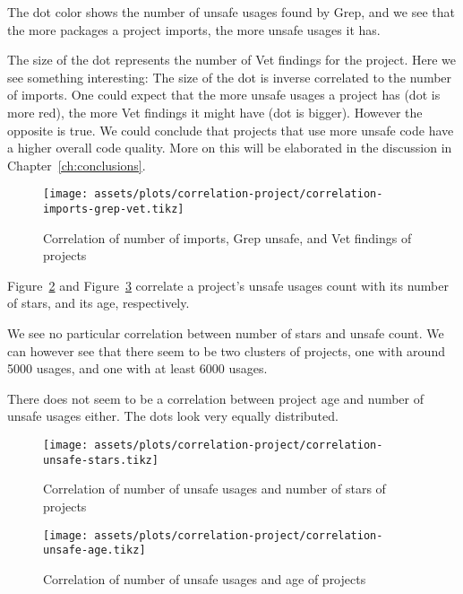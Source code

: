 The dot color shows the number of unsafe usages found by Grep, and we see that the more packages a project imports, the
more unsafe usages it has.

The size of the dot represents the number of Vet findings for the project.
Here we see something interesting:
The size of the dot is inverse correlated to the number of imports.
One could expect that the more unsafe usages a project has (dot is more red), the more Vet findings it might have (dot
is bigger).
However the opposite is true.
We could conclude that projects that use more unsafe code have a higher overall code quality.
More on this will be elaborated in the discussion in Chapter~\ref{ch:conclusions}.

\begin{figure}[ht]
    \centering
    {\scriptsize \texttt{[image: assets/plots/correlation-project/correlation-imports-grep-vet.tikz]}}
    \caption{Correlation of number of imports, Grep unsafe, and Vet findings of projects}
    \label{fig:correlations-project-imports-grep-vet}
\end{figure}

Figure~\ref{fig:correlations-project-unsafe-stars} and Figure~\ref{fig:correlations-project-unsafe-age} correlate a
project's unsafe usages count with its number of stars, and its age, respectively.

We see no particular correlation between number of stars and unsafe count.
We can however see that there seem to be two clusters of projects, one with around 5000 usages, and one with at least
6000 usages.

There does not seem to be a correlation between project age and number of unsafe usages either.
The dots look very equally distributed.

\begin{figure}[ht]
    \centering
    {\scriptsize \texttt{[image: assets/plots/correlation-project/correlation-unsafe-stars.tikz]}}
    \caption{Correlation of number of unsafe usages and number of stars of projects}
    \label{fig:correlations-project-unsafe-stars}
\end{figure}

\begin{figure}[ht]
    \centering
    {\scriptsize \texttt{[image: assets/plots/correlation-project/correlation-unsafe-age.tikz]}}
    \caption{Correlation of number of unsafe usages and age of projects}
    \label{fig:correlations-project-unsafe-age}
\end{figure}

